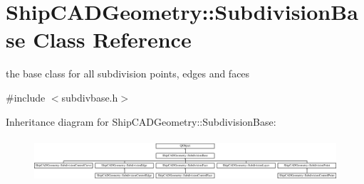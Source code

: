 \hypertarget{classShipCADGeometry_1_1SubdivisionBase}{\section{Ship\-C\-A\-D\-Geometry\-:\-:Subdivision\-Base Class Reference}
\label{classShipCADGeometry_1_1SubdivisionBase}
}


the base class for all subdivision points, edges and faces  




{\ttfamily \#include $<$subdivbase.\-h$>$}

Inheritance diagram for Ship\-C\-A\-D\-Geometry\-:\-:Subdivision\-Base\-:\begin{figure}[H]
\begin{center}
\leavevmode
\includegraphics[height=1.641026cm]{classShipCADGeometry_1_1SubdivisionBase}
\end{center}
\end{figure}
